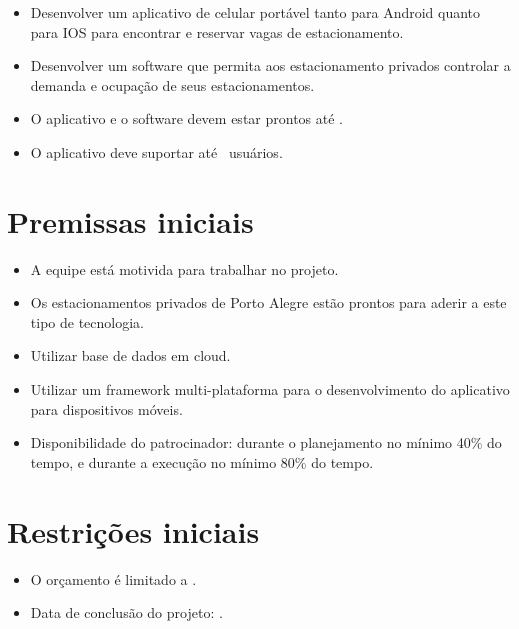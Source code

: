 \begin{itemize}
	\item Desenvolver um aplicativo de celular portável tanto para Android quanto para IOS para encontrar e reservar vagas de estacionamento.
	\item Desenvolver um software que permita aos estacionamento privados controlar a demanda e ocupação de seus estacionamentos.
	\item O aplicativo e o software devem estar prontos até \maximumDeadline.
	\item O aplicativo deve suportar até \minimumUsersAmount\ usuários.
\end{itemize}




\section{Premissas iniciais}

\begin{itemize}
	\item A equipe está motivida para trabalhar no projeto.
	\item Os estacionamentos privados de Porto Alegre estão prontos para aderir a este tipo de tecnologia.
	\item Utilizar base de dados em cloud.
	\item Utilizar um framework multi-plataforma para o desenvolvimento do aplicativo para dispositivos móveis.
	\item Disponibilidade do patrocinador: durante o planejamento no mínimo 40\% do tempo, e durante a execução no mínimo 80\% do tempo.
\end{itemize}

\section{Restrições iniciais}

\begin{itemize}
	\item O orçamento é limitado a \maximumBudget.
	\item Data de conclusão do projeto: \maximumDeadline.
\end{itemize}

